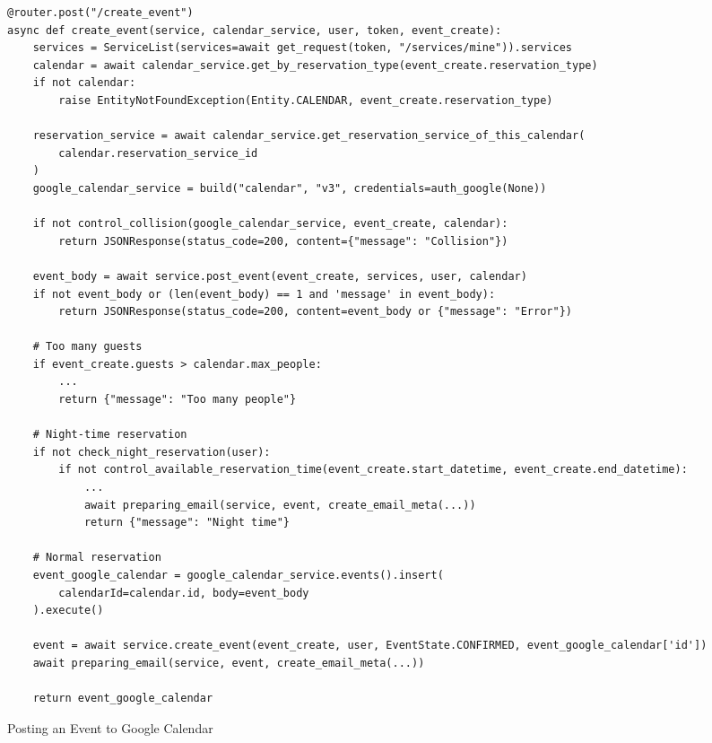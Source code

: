 \begin{listing}
  \begin{verbatim}
@router.post("/create_event")
async def create_event(service, calendar_service, user, token, event_create):
    services = ServiceList(services=await get_request(token, "/services/mine")).services
    calendar = await calendar_service.get_by_reservation_type(event_create.reservation_type)
    if not calendar:
        raise EntityNotFoundException(Entity.CALENDAR, event_create.reservation_type)
    
    reservation_service = await calendar_service.get_reservation_service_of_this_calendar(
        calendar.reservation_service_id
    )
    google_calendar_service = build("calendar", "v3", credentials=auth_google(None))

    if not control_collision(google_calendar_service, event_create, calendar):
        return JSONResponse(status_code=200, content={"message": "Collision"})

    event_body = await service.post_event(event_create, services, user, calendar)
    if not event_body or (len(event_body) == 1 and 'message' in event_body):
        return JSONResponse(status_code=200, content=event_body or {"message": "Error"})

    # Too many guests
    if event_create.guests > calendar.max_people:
        ...
        return {"message": "Too many people"}

    # Night-time reservation
    if not check_night_reservation(user):
        if not control_available_reservation_time(event_create.start_datetime, event_create.end_datetime):
            ...
            await preparing_email(service, event, create_email_meta(...))
            return {"message": "Night time"}

    # Normal reservation
    event_google_calendar = google_calendar_service.events().insert(
        calendarId=calendar.id, body=event_body
    ).execute()

    event = await service.create_event(event_create, user, EventState.CONFIRMED, event_google_calendar['id'])
    await preparing_email(service, event, create_email_meta(...))

    return event_google_calendar
\end{verbatim}
\caption{Posting an Event to Google Calendar}
\label{list:event-post}
\end{listing}

